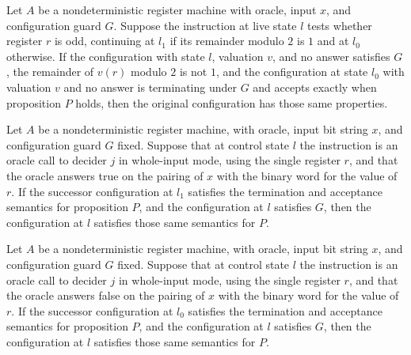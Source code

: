 \begin{lemma}
\label{Complexity.LogProg.NSem.jodd_neg}
\leanok
{}
Let $A$ be a nondeterministic register machine with oracle, input $x$, and configuration
guard $G$. Suppose the instruction at live state $l$ tests whether register $r$ is odd,
continuing at $l_1$ if its remainder modulo $2$ is $1$ and at $l_0$ otherwise. If the
configuration with state $l$, valuation $v$, and no answer satisfies $G$, the remainder
of $v(r)$ modulo $2$ is not $1$, and the configuration at state $l_0$ with valuation $v$
and no answer is terminating under $G$ and accepts exactly when proposition $P$ holds,
then the original configuration has those same properties.
\end{lemma}

\begin{lemma}
\label{Complexity.LogProg.NSem.call_pos}
\leanok
{}
Let $A$ be a nondeterministic register machine, with oracle, input bit string $x$, and
configuration guard $G$ fixed. Suppose that at control state $l$ the instruction is an
oracle call to decider $j$ in whole-input mode, using the single register $r$, and that
the oracle answers true on the pairing of $x$ with the binary word for the value of $r$.
If the successor configuration at $l_1$ satisfies the termination and acceptance
semantics for proposition $P$, and the configuration at $l$ satisfies $G$, then the
configuration at $l$ satisfies those same semantics for $P$.
\end{lemma}

\begin{lemma}
\label{Complexity.LogProg.NSem.call_neg}
\leanok
{}
Let $A$ be a nondeterministic register machine, with oracle, input bit string $x$, and
configuration guard $G$ fixed. Suppose that at control state $l$ the instruction is an
oracle call to decider $j$ in whole-input mode, using the single register $r$, and that
the oracle answers false on the pairing of $x$ with the binary word for the value of
$r$. If the successor configuration at $l_0$ satisfies the termination and acceptance
semantics for proposition $P$, and the configuration at $l$ satisfies $G$, then the
configuration at $l$ satisfies those same semantics for $P$.
\end{lemma}

